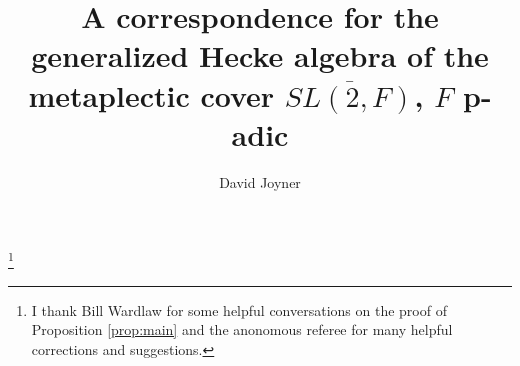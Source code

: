 %
%
%


\title[The generalized Hecke algebra of
$\overline{SL(2,F)}$]{A correspondence for the generalized Hecke algebra of
the metaplectic cover $\overline{SL(2,F)}$, $F$ p-adic} 

\author{David Joyner} 
\address{Mathematics Department, Chauvenet Hall,
572 Holloway Road, Annapolis, MD 21402, USA} 







\thanks{I thank Bill Wardlaw for some helpful 
conversations on the proof of Proposition \ref{prop:main}
and the anonomous referee for many helpful corrections
and suggestions.}


